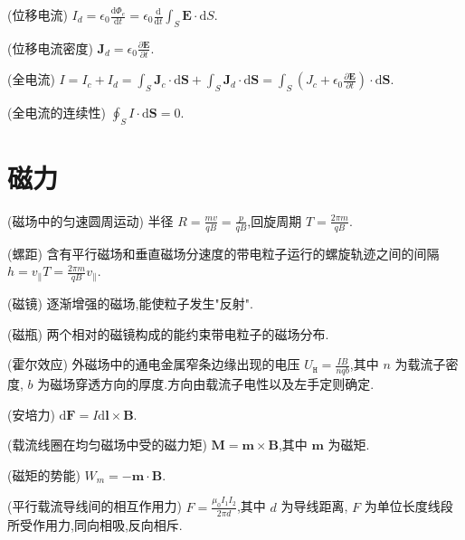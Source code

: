     \begin{definition}
        (位移电流) $I_{d}=\epsilon_0 \frac{\mathrm{d}\Phi_{e}}{\mathrm{d}t}=\epsilon_0 \frac{\mathrm{d}}{\mathrm{d}t}\int_{S}^{}\bm{E}\cdot \mathrm{d}S$.
    \end{definition}
    \begin{definition}
        (位移电流密度) $\bm{J}_{d}=\epsilon_0 \frac{\partial \bm{E}}{\partial t}$.
    \end{definition}
    \begin{definition}
        (全电流) $I=I_{c}+I_{d}=\int_{S}^{}\bm{J}_{c}\cdot\mathrm{d}\bm{S}+\int_{S}^{}\bm{J}_{d}\cdot \mathrm{d}\bm{S}=\int_{S}^{}\left( J_{c}+\epsilon_0 \frac{\partial \bm{E}}{\partial t} \right) \cdot \mathrm{d}\bm{S}$.
    \end{definition}
    \begin{theorem}
        (全电流的连续性) $\oint_{S}^{}I\cdot \mathrm{d}\bm{S}=0$.
    \end{theorem}
    \section{磁力}
    \begin{theorem}
        (磁场中的匀速圆周运动) 半径 $R=\frac{mv}{qB}=\frac{p}{qB}$,回旋周期 $T=\frac{2\pi m}{qB}$.
    \end{theorem}
    \begin{definition}
        (螺距) 含有平行磁场和垂直磁场分速度的带电粒子运行的螺旋轨迹之间的间隔 $h=v_{\parallel}T=\frac{2\pi m}{qB}v_{\parallel}$.
    \end{definition}
    \begin{definition}
        (磁镜) 逐渐增强的磁场,能使粒子发生"反射".
    \end{definition}
    \begin{definition}
        (磁瓶) 两个相对的磁镜构成的能约束带电粒子的磁场分布.
    \end{definition}
    \begin{definition}
        (霍尔效应) 外磁场中的通电金属窄条边缘出现的电压 $U_{\texttt{H}}=\frac{IB}{nqb}$,其中 $n$ 为载流子密度, $b$ 为磁场穿透方向的厚度.方向由载流子电性以及左手定则确定.
    \end{definition}
    \begin{definition}
        (安培力) $\mathrm{d}\bm{F}=I\mathrm{d}\bm{l}\times \bm{B}$.
    \end{definition}
    \begin{theorem}
        (载流线圈在均匀磁场中受的磁力矩) $\bm{M}=\bm{m}\times \bm{B}$,其中 $\bm{m}$ 为磁矩.
    \end{theorem}
    \begin{definition}
        (磁矩的势能) $W_{m}=-\bm{m}\cdot \bm{B}$.
    \end{definition}
    \begin{theorem}
        (平行载流导线间的相互作用力) $F=\frac{\mu_0I_1I_2}{2\pi d}$,其中 $d$ 为导线距离, $F$ 为单位长度线段所受作用力,同向相吸,反向相斥.
    \end{theorem}
